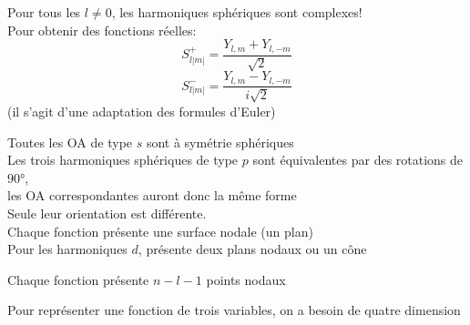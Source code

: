 \documentclass[../main.tex]{subfile}
\begin{document}
	Pour tous les $l \neq 0$, les harmoniques sphériques sont complexes!\\
	Pour obtenir des fonctions réelles:\\
	$$S^+_{l|m|} = \frac{Y_{l,m} + Y_{l,-m}}{\sqrt{2}}$$
	$$S^-_{l|m|} = \frac{Y_{l,m} - Y_{l,-m}}{i\sqrt{2}}$$
	(il s'agit d'une adaptation des formules d'Euler)

	Toutes les OA de type $s$ sont à symétrie sphériques\\



	Les trois harmoniques sphériques de type $p$ sont équivalentes par des rotations de $90°$, \\
	les OA correspondantes auront donc la même forme\\
	Seule leur orientation est différente.\\
	Chaque fonction présente une surface nodale (un plan)\\




	Pour les harmoniques $d$, présente deux plans nodaux ou un cône





	Chaque fonction présente $n - l - 1$ points nodaux
	






	Pour représenter une fonction de trois variables, on a besoin de quatre dimension 
\end{document}
